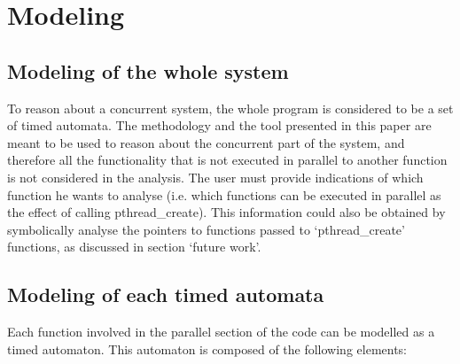 \documentclass[conference]{IEEEtran}
\begin{document}





\section{Modeling}

\subsection{Modeling of the whole system}

To reason about a concurrent system, the whole program is considered to be a set of timed automata. The methodology and the tool presented in this paper are meant to be used to reason about the concurrent part of the system, and therefore all the functionality that is not executed in parallel to another function is not considered in the analysis. The user must provide indications of which function he wants to analyse (i.e. which functions can be executed in parallel as the effect of calling pthread\_create). This information could also be obtained by symbolically analyse the pointers to functions passed to `pthread\_create' functions, as discussed in section `future work'.

\subsection{Modeling of each timed automata}

Each function involved in the parallel section of the code can be modelled as a timed automaton. This automaton is composed of the following elements:
\end{document}
